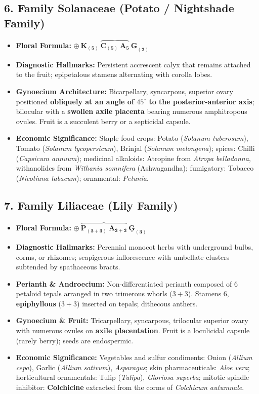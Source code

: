 \documentclass[10pt,twoside,openright]{book}
\begin{document}
\subsection{6. Family Solanaceae (Potato / Nightshade Family)}
\begin{itemize}
  \item \textbf{Floral Formula:} $\mathbf{\oplus\:\text{K}_{(5)}\:\overbrace{\text{C}_{(5)}\:\text{A}_5}\:\underline{\text{G}}_{(2)}}$
  \item \textbf{Diagnostic Hallmarks:} Persistent accrescent calyx that remains attached to the fruit; epipetalous stamens alternating with corolla lobes.
  \item \textbf{Gynoecium Architecture:} Bicarpellary, syncarpous, superior ovary positioned \textbf{obliquely at an angle of $45^\circ$ to the posterior-anterior axis}; bilocular with a \textbf{swollen axile placenta} bearing numerous amphitropous ovules. Fruit is a succulent berry or a septicidal capsule.
  \item \textbf{Economic Significance:} Staple food crops: Potato (\textit{Solanum tuberosum}), Tomato (\textit{Solanum lycopersicum}), Brinjal (\textit{Solanum melongena}); spices: Chilli (\textit{Capsicum annuum}); medicinal alkaloids: Atropine from \textit{Atropa belladonna}, withanolides from \textit{Withania somnifera} (Ashwagandha); fumigatory: Tobacco (\textit{Nicotiana tabacum}); ornamental: \textit{Petunia}.
\end{itemize}

\subsection{7. Family Liliaceae (Lily Family)}
\begin{itemize}
  \item \textbf{Floral Formula:} $\mathbf{\oplus\:\overbrace{\text{P}_{(3+3)}\:\text{A}_{3+3}}\:\underline{\text{G}}_{(3)}}$
  \item \textbf{Diagnostic Hallmarks:} Perennial monocot herbs with underground bulbs, corms, or rhizomes; scapigerous inflorescence with umbellate clusters subtended by spathaceous bracts.
  \item \textbf{Perianth \& Androecium:} Non-differentiated perianth composed of 6 petaloid tepals arranged in two trimerous whorls ($3 + 3$). Stamens 6, \textbf{epiphyllous} ($3 + 3$) inserted on tepals; dithecous anthers.
  \item \textbf{Gynoecium \& Fruit:} Tricarpellary, syncarpous, trilocular superior ovary with numerous ovules on \textbf{axile placentation}. Fruit is a loculicidal capsule (rarely berry); seeds are endospermic.
  \item \textbf{Economic Significance:} Vegetables and sulfur condiments: Onion (\textit{Allium cepa}), Garlic (\textit{Allium sativum}), \textit{Asparagus}; skin pharmaceuticals: \textit{Aloe vera}; horticultural ornamentals: Tulip (\textit{Tulipa}), \textit{Gloriosa superba}; mitotic spindle inhibitor: \textbf{Colchicine} extracted from the corms of \textit{Colchicum autumnale}.
\end{itemize}
\end{document}
